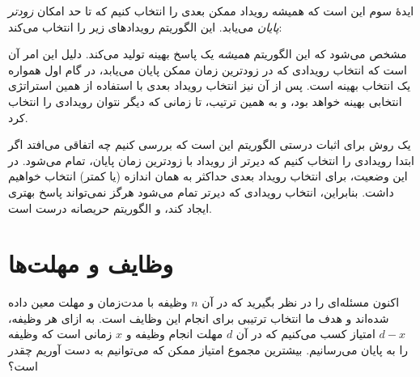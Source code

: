 ایدهٔ سوم این است که همیشه رویداد ممکن بعدی را انتخاب کنیم که تا حد امکان \emph{زودتر} \emph{پایان} می‌یابد.
این الگوریتم رویدادهای زیر را انتخاب می‌کند: 
\begin{center}
\end{center}

مشخص می‌شود که این الگوریتم \emph{همیشه} یک پاسخ بهینه تولید می‌کند.
دلیل این امر آن است که انتخاب رویدادی که در زودترین زمان ممکن پایان می‌یابد، در گام اول همواره یک انتخاب بهینه است.
پس از آن نیز انتخاب رویداد بعدی با استفاده از همین استراتژی انتخابی بهینه خواهد بود، و به همین ترتیب،
تا زمانی که دیگر نتوان رویدادی را انتخاب کرد.

یک روش برای اثبات درستی الگوریتم این است که بررسی کنیم
چه اتفاقی می‌افتد اگر ابتدا رویدادی را انتخاب کنیم
که دیرتر از رویداد با زودترین زمان پایان، تمام می‌شود.
در این وضعیت، برای انتخاب رویداد بعدی حداکثر به همان اندازه (یا کمتر) انتخاب خواهیم داشت.
بنابراین، انتخاب رویدادی که دیرتر تمام می‌شود هرگز نمی‌تواند پاسخ بهتری ایجاد کند،
و الگوریتم حریصانه درست است.

\section{وظایف و مهلت‌ها}

اکنون مسئله‌ای را در نظر بگیرید که در آن
$n$ وظیفه با مدت‌زمان و مهلت معین داده شده‌اند
و هدف ما انتخاب ترتیبی برای انجام این وظایف است.
به ازای هر وظیفه، $d-x$ امتیاز کسب می‌کنیم
که در آن $d$ مهلت انجام وظیفه
و $x$ زمانی است که وظیفه را به پایان می‌رسانیم.
بیشترین مجموع امتیاز ممکن که می‌توانیم به دست آوریم چقدر است؟

